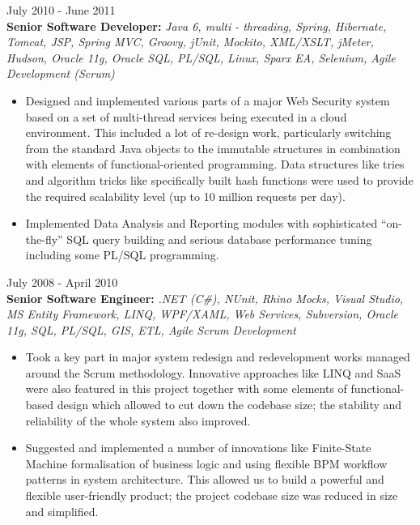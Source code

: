 \documentclass{res}
\begin{document}
\begin{resume}
 \hfill        July 2010 - June 2011\\
{\bf Senior Software Developer:} {\em Java 6, multi - threading, Spring, Hibernate, Tomcat, JSP, Spring MVC, Groovy, jUnit, Mockito, XML/XSLT, jMeter, Hudson, Oracle 11g, Oracle SQL, PL/SQL, Linux, Sparx EA, Selenium, Agile Development (Scrum)}
\begin{itemize} \itemsep -2pt %
 \item Designed and implemented various parts of a major Web Security system based on a set of multi-thread services being executed in a cloud environment. This included a lot of re-design work, particularly switching from the standard Java objects to the immutable structures in combination with elements of functional-oriented programming. Data structures like tries and algorithm tricks like specifically built hash functions were used to provide the required scalability level (up to 10 million requests per day).
 \item Implemented Data Analysis and Reporting modules with sophisticated “on-the-fly” SQL query building and serious database performance tuning including some PL/SQL programming.
\end{itemize}

 \hfill      July 2008 - April 2010\\
{\bf Senior Software Engineer:} {\em .NET (C\#), NUnit, Rhino Mocks, Visual Studio, MS Entity Framework, LINQ, WPF/XAML, Web Services, Subversion, Oracle 11g, SQL, PL/SQL, GIS, ETL, Agile Scrum Development}
\begin{itemize} \itemsep -2pt %
 \item Took a key part in major system redesign and redevelopment works managed around the Scrum methodology. Innovative approaches like LINQ and SaaS were also featured in this project together with some elements of functional-based design which allowed to cut down the codebase size; the stability and reliability of the whole system also improved.
 \item Suggested and implemented a number of innovations like Finite-State Machine formalisation of business logic and using flexible BPM workflow patterns in system architecture. This allowed us to build a powerful and flexible user-friendly product; the project codebase size was reduced in size and simplified.
\end{itemize}


\end{resume}
\end{document}
